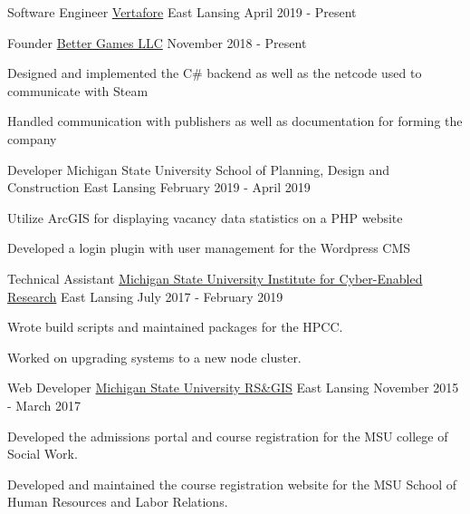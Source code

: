 
\begin{cventries}

  \cventry
    {Software Engineer} %
    {\href{https://www.vertafore.com}{Vertafore}} %
    {East Lansing} %
    {April 2019 - Present} %
    {
    }

  \cventry
    {Founder}
    {\href{https://better-games.org}{Better Games LLC}}
    {}
    {November 2018 - Present}
    {
        \begin{cvitems}
          \item {Designed and implemented the C\# backend as well as the netcode used to communicate with Steam}
          \item {Handled communication with publishers as well as documentation for forming the company}
        \end{cvitems}
    }

  \cventry
  {Developer}
  {Michigan State University School of Planning, Design and Construction}
  {East Lansing}
  {February 2019 - April 2019}
  {
    \begin{cvitems}
      \item {Utilize ArcGIS for displaying vacancy data statistics on a PHP website}
      \item {Developed a login plugin with user management for the Wordpress CMS}
    \end{cvitems}
  }

  \cventry
    {Technical Assistant}
    {\href{https://icer.msu.edu}{Michigan State University Institute for Cyber-Enabled Research}}
    {East Lansing}
    {July 2017 - February 2019}
    {
      \begin{cvitems}
        \item {Wrote build scripts and maintained packages for the HPCC.}
        \item {Worked on upgrading systems to a new node cluster.}
      \end{cvitems}
    }

  \cventry
    {Web Developer}
    {\href{http://www.rsgis.msu.edu}{Michigan State University RS\&GIS}}
    {East Lansing}
    {November 2015 - March 2017}
    {
      \begin{cvitems}
        \item {Developed the admissions portal and course registration for the MSU college of Social Work.}
        \item {Developed and maintained the course registration website for the MSU School of Human Resources and Labor Relations.}
      \end{cvitems}
    }


\end{cventries}
